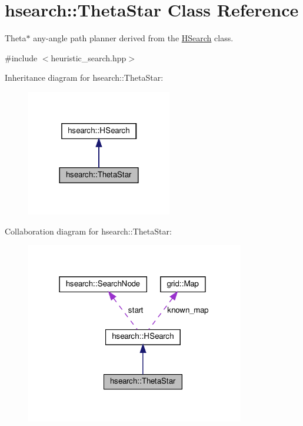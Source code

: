 \hypertarget{classhsearch_1_1ThetaStar}{}\section{hsearch\+:\+:Theta\+Star Class Reference}
\label{classhsearch_1_1ThetaStar}


Theta$\ast$ any-\/angle path planner derived from the \hyperlink{classhsearch_1_1HSearch}{H\+Search} class.  




{\ttfamily \#include $<$heuristic\+\_\+search.\+hpp$>$}



Inheritance diagram for hsearch\+:\+:Theta\+Star\+:
\nopagebreak
\begin{figure}[H]
\begin{center}
\leavevmode
\includegraphics[width=180pt]{d9/db2/classhsearch_1_1ThetaStar__inherit__graph}
\end{center}
\end{figure}


Collaboration diagram for hsearch\+:\+:Theta\+Star\+:
\nopagebreak
\begin{figure}[H]
\begin{center}
\leavevmode
\includegraphics[width=271pt]{da/d4f/classhsearch_1_1ThetaStar__coll__graph}
\end{center}
\end{figure}
